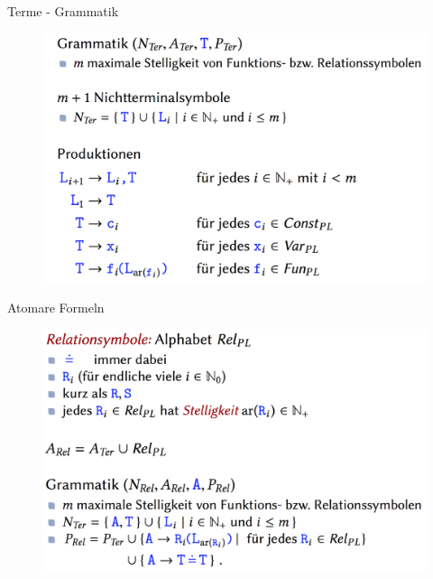 \begin{frame}{Terme - Grammatik}
\begin{figure}[h!]
	\centering
	\includegraphics[scale=0.2]{TermeGrammatik.png} \hspace{2em} 
\end{figure} 
\end{frame}

\begin{frame}{Atomare Formeln}
\begin{figure}[h!]
	\centering
	\includegraphics[scale=0.2]{AFormeln.png} \hspace{2em} 
\end{figure} 
\end{frame}

